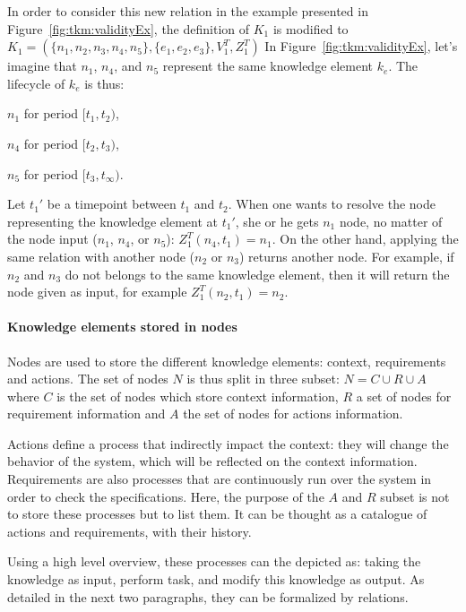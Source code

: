 In order to consider this new relation in the example presented in Figure~\ref{fig:tkm:validityEx}, the definition of $K_1$ is modified to $K_1 = (\{n_1, n_2, n_3, n_4, n_5\}, \{e_1, e_2, e_3\}, V^{T}_1, Z^{T}_1)$
In Figure~\ref{fig:tkm:validityEx}, let's imagine that $n_1$, $n_4$, and $n_5$ represent the same knowledge element $k_e$.
The lifecycle of $k_e$ is thus:
\begin{condItemize}
	\item $n_1$ for period $[t_1, t_2)$,
	\item $n_4$ for period $[t_2, t_3)$,
	\item $n_5$ for period $[t_3, t_\infty)$.
\end{condItemize}

Let $t_1'$ be a timepoint between $t_1$ and $t_2$.
When one wants to resolve the node representing the knowledge element at $t_1'$, she or he gets $n_1$ node, no matter of the node input ($n_1$, $n_4$, or $n_5$): $Z^{T}_1(n_4, t_1) = n_1$.
On the other hand, applying the same relation with another node ($n_2$ or $n_3$) returns another node.
For example, if $n_2$ and $n_3$ do not belongs to the same knowledge element, then it will return the node given as input, for example $Z^{T}_1(n_2, t_1) = n_2$.

\paragraph{Knowledge elements stored in nodes}
Nodes are used to store the different knowledge elements: context, requirements and actions.
The set of nodes $N$ is thus split in three subset: $N = C \cup R \cup A$ where $C$ is the set of nodes which store context information, $R$ a set of nodes for requirement information and $A$ the set of nodes for actions information.

Actions define a process that indirectly impact the context: they will change the behavior of the system, which will be reflected on the context information.
Requirements are also processes that are continuously run over the system in order to check the specifications.
Here, the purpose of the $A$ and $R$ subset is not to store these processes but to list them.
It can be thought as a catalogue of actions and requirements, with their history.

Using a high level overview, these processes can the depicted as: taking the knowledge as input, perform task, and modify this knowledge as output.
As detailed in the next two paragraphs, they can be formalized by relations.


